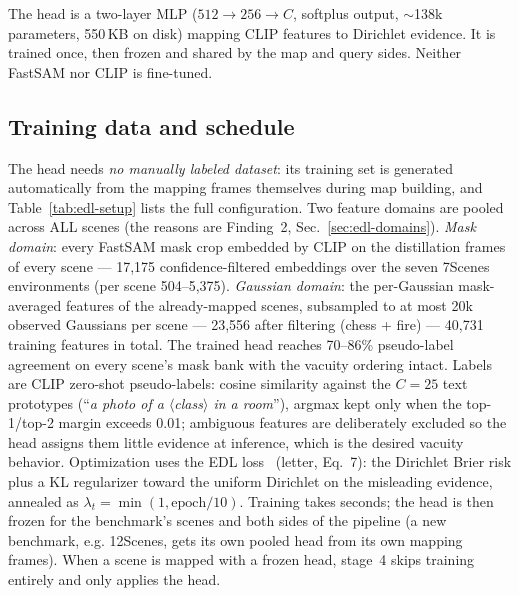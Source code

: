 \documentclass[journal]{IEEEtran}
\begin{document}
The head is a two-layer MLP ($512 \to 256 \to C$, softplus output,
$\sim$138k parameters, 550\,KB on disk) mapping CLIP features to Dirichlet
evidence. It is trained once, then frozen and shared by the map and query
sides. Neither FastSAM nor CLIP is fine-tuned.

\subsection{Training data and schedule}
\label{sec:edl-training}
The head needs \emph{no manually labeled dataset}: its training set is
generated automatically from the mapping frames themselves during map
building, and Table~\ref{tab:edl-setup} lists the full configuration. Two
feature domains are pooled across ALL scenes (the reasons are Finding~2,
Sec.~\ref{sec:edl-domains}). \emph{Mask domain}: every FastSAM mask crop
embedded by CLIP on the distillation frames of every scene --- 17{,}175
confidence-filtered embeddings over the seven 7Scenes environments (per
scene 504--5{,}375). \emph{Gaussian domain}: the per-Gaussian mask-averaged
features of the already-mapped scenes, subsampled to at most 20k observed
Gaussians per scene --- 23{,}556 after filtering (chess + fire) ---
40{,}731 training features in total. The trained head reaches 70--86\%
pseudo-label agreement on every scene's mask bank with the vacuity ordering
intact. Labels are CLIP zero-shot pseudo-labels: cosine
similarity against the $C{=}25$ text prototypes (``\emph{a photo of a
$\langle$class$\rangle$ in a room}''), argmax kept only when the
top-1/top-2 margin exceeds 0.01; ambiguous features are deliberately
excluded so the head assigns them little evidence at inference, which is
the desired vacuity behavior. Optimization uses the EDL loss~\cite{edl}
(letter, Eq.~7): the Dirichlet Brier risk plus a KL regularizer toward the
uniform Dirichlet on the misleading evidence, annealed as
$\lambda_t = \min(1, \mathrm{epoch}/10)$. Training takes seconds; the head is then frozen for the benchmark's
scenes and both sides of the pipeline (a new benchmark, e.g. 12Scenes,
gets its own pooled head from its own mapping frames). When a scene
is mapped with a frozen head, stage~4 skips training entirely and only
applies the head.
\end{document}
